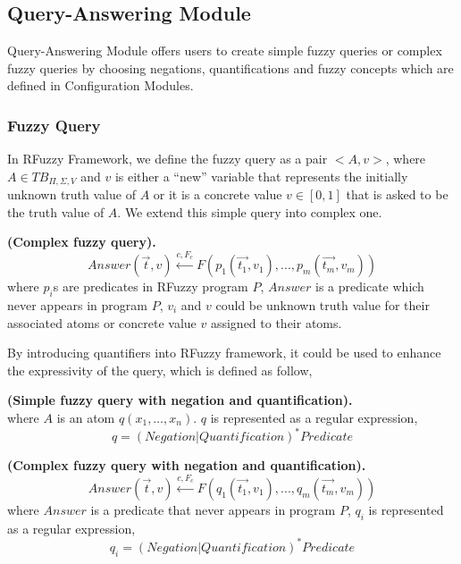\newpage
\subsection{Query-Answering Module}
\label{sec:QAModule}
Query-Answering Module offers users to create simple fuzzy queries or complex fuzzy queries by choosing negations, quantifications and fuzzy concepts which are defined in Configuration Modules. 
\subsubsection{Fuzzy Query}
In RFuzzy Framework, we define the fuzzy query as a pair $<A,v>$, where $A \in TB_{\Pi,\Sigma,V}$ and $v$ is either a ``new'' variable that represents the initially unknown truth value of $A$ or it is a concrete value $v \in [0,1]$ that is asked to be the truth value of $A$. We extend this simple query into complex one.

\begin{defin} \textbf{(Complex fuzzy query).}
\label{def:ComplexFuzzyQuery}
\[Answer(\vec{t},v) \stackrel{c,F_c}{\longleftarrow} F(p_1(\vec{t_1},v_1),...,p_m(\vec{t_m},v_m))\]
where $p_i$s are predicates in RFuzzy program $P$, $Answer$ is a predicate which never appears in program $P$, $v_i$ and $v$ could be unknown truth value for their associated atoms or concrete value $v$ assigned to their atoms.

\end{defin}

By introducing quantifiers into RFuzzy framework, it could be used to enhance the expressivity of the query, which is defined as follow,

\begin{defin} \textbf{(Simple fuzzy query with negation and quantification). }
\label{def:SFQNegQuan}
\[< A,v >\]
where $A$ is an atom $q(x_1, \dots, x_n)$. $q$ is represented as a regular expression, 
\[q= (Negation|Quantification)^*Predicate\]
\end{defin}

\begin{defin} \textbf{(Complex fuzzy query with negation and quantification). }
\label{def:CFQNegQuan}
\[Answer(\vec{t},v) \stackrel{c,F_c}{\longleftarrow} F(q_1(\vec{t_1},v_1),...,q_m(\vec{t_m},v_m))\]
where $Answer$ is a predicate that never appears in program $P$, $q_i$ is represented as a regular expression, 
\[q_i = (Negation|Quantification)^*Predicate\]
\end{defin}


